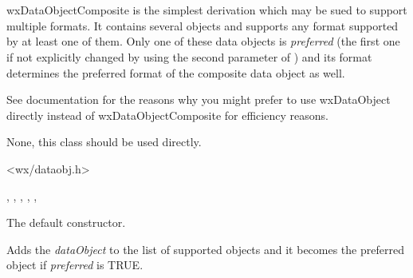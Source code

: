 
\section{}\label{wxdataobjectcomposite}

wxDataObjectComposite is the simplest 
 derivation which may be sued to support
multiple formats. It contains several 
 objects and supports any
format supported by at least one of them. Only one of these data objects is
{\it preferred} (the first one if not explicitly changed by using the second
parameter of ) and its format determines
the preferred format of the composite data object as well.

See  documentation for the reasons why you
might prefer to use wxDataObject directly instead of wxDataObjectComposite for
efficiency reasons.


None, this class should be used directly.




<wx/dataobj.h>


, 
, 
, 
, 
, 


\label{wxdataobjectcompositewxdataobjectcomposite}


The default constructor.

\label{wxdataobjectcompositeadd}


Adds the {\it dataObject} to the list of supported objects and it becomes the
preferred object if {\it preferred} is TRUE.


